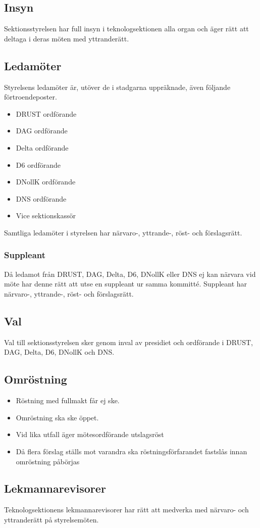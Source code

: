 \subsection{Insyn} 

Sektionsstyrelsen har full insyn i teknologsektionen alla organ och äger rätt att deltaga i deras möten med yttranderätt. 

\subsection{Ledamöter}
Styrelsens ledamöter är, utöver de i stadgarna uppräknade, även följande förtroendeposter. 
\begin{itemize}
  \item DRUST ordförande 
  \item DAG ordförande 
  \item Delta ordförande 
  \item D6 ordförande 
  \item DNollK ordförande
  \item DNS ordförande
  \item Vice sektionskassör
\end{itemize}

Samtliga ledamöter i styrelsen har närvaro-, yttrande-, röst- och förslagsrätt.

\subsubsection{Suppleant}
Då ledamot från DRUST, DAG, Delta, D6, DNollK eller DNS ej kan närvara vid möte har denne rätt att utse en suppleant ur samma kommitté.
Suppleant har närvaro-, yttrande-, röst- och förslagsrätt.

\subsection{Val}
Val till sektionsstyrelsen sker genom inval av presidiet och ordförande i DRUST, DAG, Delta, D6, DNollK och DNS.

\subsection{Omröstning} 

\begin{itemize}
  \item Röstning med fullmakt får ej ske. 
  \item Omröstning ska ske öppet.
  \item Vid lika utfall äger mötesordförande utslagsröst
  \item Då flera förslag ställs mot varandra ska röstningsförfarandet fastslås innan omröstning påbörjas
\end{itemize}

\subsection{Lekmannarevisorer}
Teknologsektionens lekmannarevisorer har rätt att medverka med närvaro-
och yttranderätt på styrelsemöten.
\newpage

